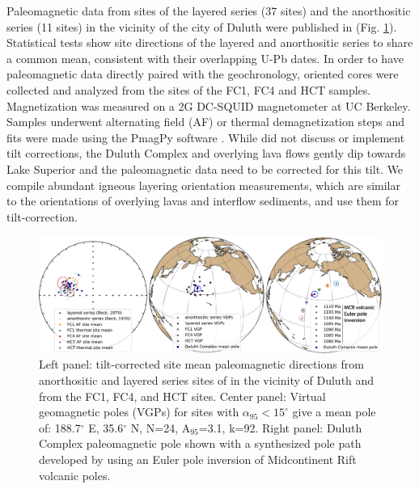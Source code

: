\documentclass[11pt,letterpaper]{article}
\begin{document}
\begin{table}[h!]
\label{tab:geochron}
\end{table}

Paleomagnetic data from sites of the layered series (37 sites) and the anorthositic series (11 sites) in the vicinity of the city of Duluth were published in \cite{Beck1970a} (Fig. \ref{fig:poles}). Statistical tests show site directions of the layered and anorthositic series to share a common mean, consistent with their overlapping U-Pb dates. In order to have paleomagnetic data directly paired with the geochronology, oriented cores were collected and analyzed from the sites of the FC1, FC4 and HCT samples. Magnetization was measured on a 2G DC-SQUID magnetometer at UC Berkeley. Samples underwent alternating field (AF) or thermal demagnetization steps and fits were made using the PmagPy software \citep{Tauxe2016a}. While \cite{Beck1970a} did not discuss or implement tilt corrections, the Duluth Complex and overlying lava flows gently dip towards Lake Superior and the paleomagnetic data need to be corrected for this tilt. We compile abundant igneous layering orientation measurements, which are similar to the orientations of overlying lavas and interflow sediments, and use them for tilt-correction.

\begin{figure}[!ht]
\noindent\includegraphics[width=\textwidth]{./Figures/Duluth_Complex_pole.pdf}
\caption{\small{Left panel: tilt-corrected site mean paleomagnetic directions from anorthositic and layered series sites of \cite{Beck1970a} in the vicinity of Duluth and from the FC1, FC4, and HCT sites. Center panel: Virtual geomagnetic poles (VGPs) for sites with $\alpha_{95}<15^{\circ}$ give a mean pole of: 188.7$^{\circ}$ E, 35.6$^{\circ}$ N, N=24, A$_{95}$=3.1, k=92. Right panel: Duluth Complex paleomagnetic pole shown with a synthesized pole path developed by \citealp{Swanson-Hysell2019a} using an Euler pole inversion of Midcontinent Rift volcanic poles.}}
\label{fig:poles}
\end{figure}
\end{document}
